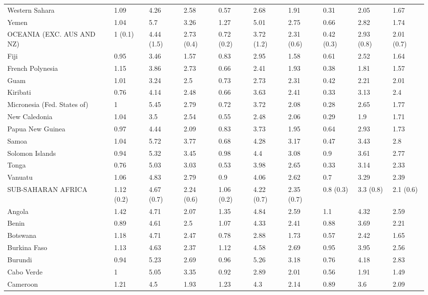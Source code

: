 \begin{longtable}[t]{llllllllll}
Western Sahara & 1.09 & 4.26 & 2.58 & 0.57 & 2.68 & 1.91 & 0.31 & 2.05 & 1.67\\
Yemen & 1.04 & 5.7 & 3.26 & 1.27 & 5.01 & 2.75 & 0.66 & 2.82 & 1.74\\
OCEANIA (EXC. AUS AND NZ) & 1 (0.1) & 4.44 (1.5) & 2.73 (0.4) & 0.72 (0.2) & 3.72 (1.2) & 2.31 (0.6) & 0.42 (0.3) & 2.93 (0.8) & 2.01 (0.7)\\
Fiji & 0.95 & 3.46 & 1.57 & 0.83 & 2.95 & 1.58 & 0.61 & 2.52 & 1.64\\
French Polynesia & 1.15 & 3.86 & 2.73 & 0.66 & 2.41 & 1.93 & 0.38 & 1.81 & 1.57\\
Guam & 1.01 & 3.24 & 2.5 & 0.73 & 2.73 & 2.31 & 0.42 & 2.21 & 2.01\\
Kiribati & 0.76 & 4.14 & 2.48 & 0.66 & 3.63 & 2.41 & 0.33 & 3.13 & 2.4\\
Micronesia (Fed. States of) & 1 & 5.45 & 2.79 & 0.72 & 3.72 & 2.08 & 0.28 & 2.65 & 1.77\\
New Caledonia & 1.04 & 3.5 & 2.54 & 0.55 & 2.48 & 2.06 & 0.29 & 1.9 & 1.71\\
Papua New Guinea & 0.97 & 4.44 & 2.09 & 0.83 & 3.73 & 1.95 & 0.64 & 2.93 & 1.73\\
Samoa & 1.04 & 5.72 & 3.77 & 0.68 & 4.28 & 3.17 & 0.47 & 3.43 & 2.8\\
Solomon Islands & 0.94 & 5.32 & 3.45 & 0.98 & 4.4 & 3.08 & 0.9 & 3.61 & 2.77\\
Tonga & 0.76 & 5.03 & 3.03 & 0.53 & 3.98 & 2.65 & 0.33 & 3.14 & 2.33\\
Vanuatu & 1.06 & 4.83 & 2.79 & 0.9 & 4.06 & 2.62 & 0.7 & 3.29 & 2.39\\
SUB-SAHARAN AFRICA & 1.12 (0.2) & 4.67 (0.7) & 2.24 (0.6) & 1.06 (0.2) & 4.22 (0.7) & 2.35 (0.7) & 0.8 (0.3) & 3.3 (0.8) & 2.1 (0.6)\\
Angola & 1.42 & 4.71 & 2.07 & 1.35 & 4.84 & 2.59 & 1.1 & 4.32 & 2.59\\
Benin & 0.89 & 4.61 & 2.5 & 1.07 & 4.33 & 2.41 & 0.88 & 3.69 & 2.21\\
Botswana & 1.18 & 4.71 & 2.47 & 0.78 & 2.88 & 1.73 & 0.57 & 2.42 & 1.65\\
Burkina Faso & 1.13 & 4.63 & 2.37 & 1.12 & 4.58 & 2.69 & 0.95 & 3.95 & 2.56\\
Burundi & 0.94 & 5.23 & 2.69 & 0.96 & 5.26 & 3.18 & 0.76 & 4.18 & 2.83\\
Cabo Verde & 1 & 5.05 & 3.35 & 0.92 & 2.89 & 2.01 & 0.56 & 1.91 & 1.49\\
Cameroon & 1.21 & 4.5 & 1.93 & 1.23 & 4.3 & 2.14 & 0.89 & 3.6 & 2.09\\

\end{longtable}
